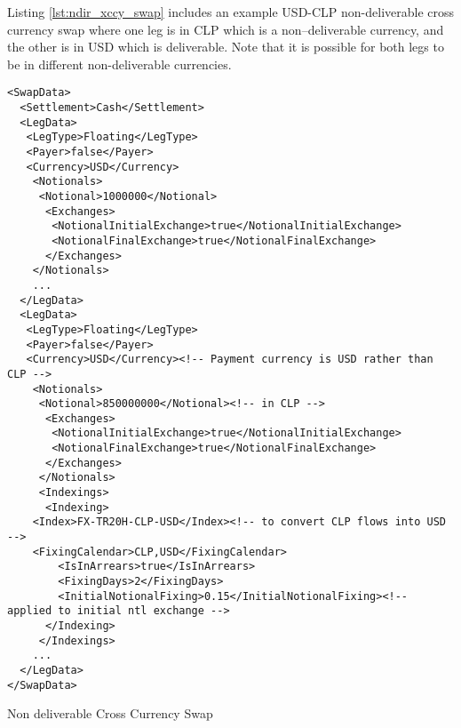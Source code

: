 Listing \ref{lst:ndir_xccy_swap} includes an example USD-CLP non-deliverable cross currency swap where one leg is in CLP which is a non–deliverable
currency, and the other is in USD which is deliverable. Note that it is possible for both legs to be in different non-deliverable currencies.

\begin{listing}[H]
\begin{verbatim}
<SwapData>
  <Settlement>Cash</Settlement>
  <LegData>
   <LegType>Floating</LegType>
   <Payer>false</Payer>  
   <Currency>USD</Currency>
    <Notionals>
     <Notional>1000000</Notional>
      <Exchanges>
       <NotionalInitialExchange>true</NotionalInitialExchange>
       <NotionalFinalExchange>true</NotionalFinalExchange>
      </Exchanges>
    </Notionals>
    ...
  </LegData>
  <LegData>
   <LegType>Floating</LegType>
   <Payer>false</Payer>  
   <Currency>USD</Currency><!-- Payment currency is USD rather than CLP -->
    <Notionals>
     <Notional>850000000</Notional><!-- in CLP -->
      <Exchanges>
       <NotionalInitialExchange>true</NotionalInitialExchange>
       <NotionalFinalExchange>true</NotionalFinalExchange>
      </Exchanges>
     </Notionals>
     <Indexings>
      <Indexing>
	<Index>FX-TR20H-CLP-USD</Index><!-- to convert CLP flows into USD -->
	<FixingCalendar>CLP,USD</FixingCalendar>
        <IsInArrears>true</IsInArrears>
        <FixingDays>2</FixingDays>
        <InitialNotionalFixing>0.15</InitialNotionalFixing><!-- applied to initial ntl exchange -->
      </Indexing>
     </Indexings>     
    ...
  </LegData>
</SwapData>
\end{verbatim}
\caption{Non deliverable Cross Currency Swap}
\label{lst:ndir_xccy_swap}
\end{listing}
